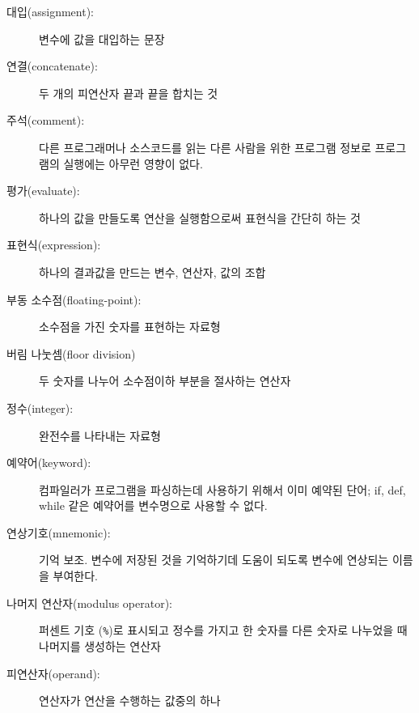 \begin{description}

\item[대입(assignment):] 변수에 값을 대입하는 문장

\item[연결(concatenate):] 두 개의 피연산자 끝과 끝을 합치는 것

\item[주석(comment):] 다른 프로그래머나 소스코드를 읽는 다른 사람을 위한 프로그램 정보로 프로그램의 실행에는 아무런 영향이 없다.

\item[평가(evaluate):] 하나의 값을 만들도록 연산을 실행함으로써 표현식을 간단히 하는 것

\item[표현식(expression):] 하나의 결과값을 만드는 변수, 연산자, 값의 조합

\item[부동 소수점(floating-point):] 소수점을 가진 숫자를 표현하는 자료형

\item[버림 나눗셈(floor division)] 두 숫자를 나누어 소수점이하 부분을 절사하는 연산자

\item[정수(integer):] 완전수를 나타내는 자료형

\item[예약어(keyword):] 컴파일러가 프로그램을 파싱하는데 사용하기 위해서 이미 예약된 단어; if, def, while 같은 예약어를 변수명으로 사용할 수 없다.

\item[연상기호(mnemonic):] 기억 보조. 변수에 저장된 것을 기억하기데 도움이 되도록 변수에 연상되는 이름을 부여한다.

\item[나머지 연산자(modulus operator):] 
퍼센트 기호 ({\tt \%})로 표시되고 정수를 가지고 한 숫자를 다른 숫자로 나누었을 때 나머지를 생성하는 연산자

\item[피연산자(operand):] 연산자가 연산을 수행하는 값중의 하나


\end{description}
